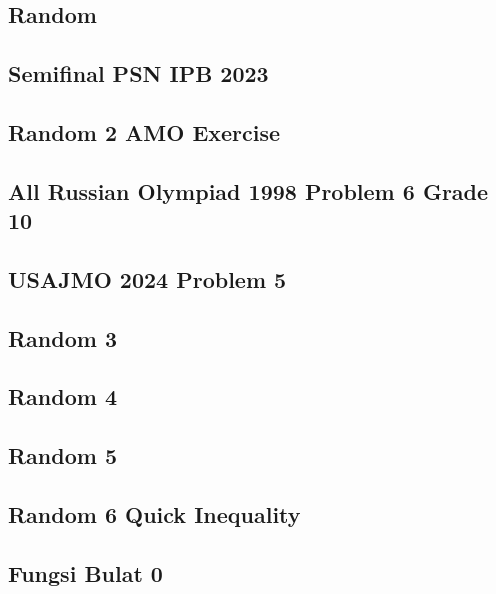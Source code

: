 \subsection{Random}

\newpage

\subsection{Semifinal PSN IPB 2023}

\newpage

\subsection{Random 2 AMO Exercise}

\newpage

\subsection{All Russian Olympiad 1998 Problem 6 Grade 10}

\newpage

\subsection{USAJMO 2024 Problem 5}

\newpage

\subsection{Random 3}

\newpage

\subsection{Random 4}

\newpage

\subsection{Random 5}

\newpage

\subsection{Random 6 Quick Inequality}

\newpage

\subsection{Fungsi Bulat 0}

\newpage

